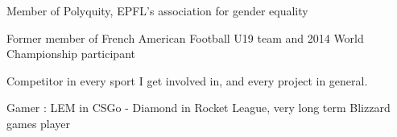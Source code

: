 


\begin{cventries}


\cventry
{} %
{}
{}
{}
{ %
\begin{cvitems}
\item {Member of Polyquity, EPFL's association for gender equality}
\item {Former member of French American Football U19 team and 2014 World Championship participant}
\item {Competitor in every sport I get involved in, and every project in general.}
\item {Gamer : LEM in CSGo - Diamond in Rocket League, very long term Blizzard games player}
\end{cvitems}
}




\end{cventries}